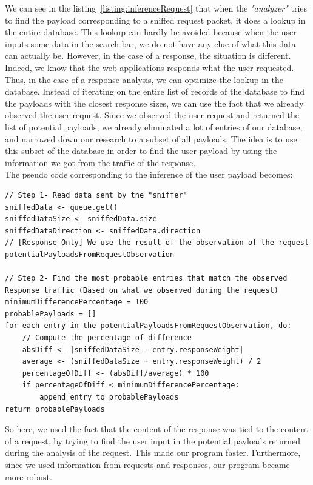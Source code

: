 \documentclass[runningheads]{llncs}
\begin{document}
We can see in the listing~\ref{listing:inferenceRequest} that when the \emph{"analyzer"} tries to find the payload corresponding to a sniffed request packet, it does a lookup in the entire database. This lookup can hardly be avoided because when the user inputs some data in the search bar, we do not have any clue of what this data can actually be. However, in the case of a response, the situation is different. Indeed, we know that the web applications responds what the user requested. Thus, in the case of a response analysis, we can optimize the lookup in the database. Instead of iterating on the entire list of records of the database to find the payloads with the closest response sizes, we can use the fact that we already observed the user request. Since we observed the user request and returned the list of potential payloads, we already eliminated a lot of entries of our database, and narrowed down our research to a subset of all payloads. The idea is to use this subset of the database in order to find the user payload by using the information we got from the traffic of the response. \\

The pseudo code corresponding to the inference of the user payload becomes:

\begin{lstlisting}[caption=Pseudo algorithm to infer user input during a Response (using the result of the inference on the request), label={listing:inferenceResponse}]
// Step 1- Read data sent by the "sniffer"
sniffedData <- queue.get()
sniffedDataSize <- sniffedData.size
sniffedDataDirection <- sniffedData.direction
// [Response Only] We use the result of the observation of the request
potentialPayloadsFromRequestObservation

// Step 2- Find the most probable entries that match the observed Response traffic (Based on what we observed during the request)
minimumDifferencePercentage = 100
probablePayloads = []
for each entry in the potentialPayloadsFromRequestObservation, do:
	// Compute the percentage of difference
    absDiff <- |sniffedDataSize - entry.responseWeight|
    average <- (sniffedDataSize + entry.responseWeight) / 2
    percentageOfDiff <- (absDiff/average) * 100
    if percentageOfDiff < minimumDifferencePercentage:
    	append entry to probablePayloads
return probablePayloads
\end{lstlisting}

So here, we used the fact that the content of the response was tied to the content of a request, by trying to find the user input in the potential payloads returned during the analysis of the request. This made our program faster. Furthermore, since we used information from requests and responses, our program became more robust.
\end{document}
